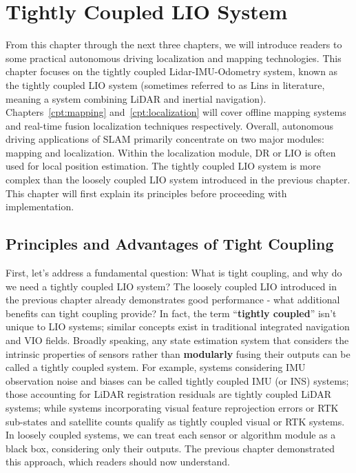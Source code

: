\thispagestyle{empty}
\chapter{Tightly Coupled LIO System}
\label{cpt:tightly-lio}
\thispagestyle{empty}

From this chapter through the next three chapters, we will introduce readers to some practical autonomous driving localization and mapping technologies. This chapter focuses on the tightly coupled Lidar-IMU-Odometry system, known as the tightly coupled LIO system (sometimes referred to as Lins\cite{Qin2020} in literature, meaning a system combining LiDAR and inertial navigation). Chapters~\ref{cpt:mapping} and~\ref{cpt:localization} will cover offline mapping systems and real-time fusion localization techniques respectively. Overall, autonomous driving applications of SLAM primarily concentrate on two major modules: mapping and localization. Within the localization module, DR or LIO is often used for local position estimation. The tightly coupled LIO system is more complex than the loosely coupled LIO system introduced in the previous chapter. This chapter will first explain its principles before proceeding with implementation.



\section{Principles and Advantages of Tight Coupling}
First, let's address a fundamental question: What is tight coupling, and why do we need a tightly coupled LIO system? The loosely coupled LIO introduced in the previous chapter already demonstrates good performance - what additional benefits can tight coupling provide? In fact, the term ``\textbf{tightly coupled}'' isn't unique to LIO systems; similar concepts exist in traditional integrated navigation and VIO fields\cite{yang2019tightly,liu2018implementation,kong2015tightly}. Broadly speaking, any state estimation system that considers the intrinsic properties of sensors rather than \textbf{modularly} fusing their outputs can be called a tightly coupled system\cite{Soloviev2008}. For example, systems considering IMU observation noise and biases can be called tightly coupled IMU (or INS) systems; those accounting for LiDAR registration residuals are tightly coupled LiDAR systems; while systems incorporating visual feature reprojection errors or RTK sub-states and satellite counts qualify as tightly coupled visual or RTK systems\cite{Shi2012,Schleicher2009}. In loosely coupled systems, we can treat each sensor or algorithm module as a black box, considering only their outputs. The previous chapter demonstrated this approach, which readers should now understand.

